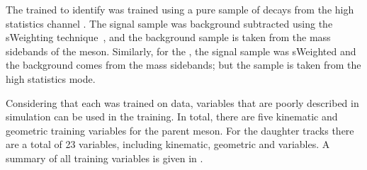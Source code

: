 
The \bdt trained to identify \dstokkpi was trained using a pure sample of \dstokkpi decays from the
high statistics channel \decay{\Bsb}{\Dsp\pim}.
The signal sample was background subtracted using the sWeighting technique~\cite{splot}, and the
background sample is taken from the mass sidebands of the \Ds meson.
Similarly, for the \phii \bdt, the signal sample was sWeighted and the background comes from the
\phii mass sidebands; but the sample is taken from the high statistics \bstojpsiphi mode.

Considering that each \bdt was trained on data, variables that are poorly described in simulation
can be used in the training.
In total, there are five kinematic and geometric training variables for the parent meson.
For the daughter tracks there are a total of 23 variables, including kinematic, geometric and \pid
variables.
A summary of all training variables is given in .







